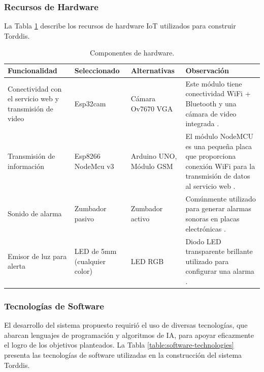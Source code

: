 \documentclass[a4paper,fleqn]{cas-sc}
\begin{document}
				\subsubsection*{Recursos de Hardware}
					La Tabla \ref{table:hardware-components} describe los recursos de hardware IoT utilizados para construir Torddis. 
					
					\begin{table}[htb]
						\caption{Componentes de hardware.}
						\label{table:hardware-components}
						\centering
						\begin{tabular}{p{}p{0.15\textwidth}p{}p{}}
							\hline
							\multicolumn{1}{l}{\textbf{Funcionalidad}} & \multicolumn{1}{l}{\textbf{Seleccionado}} & \multicolumn{1}{l}{\textbf{Alternativas}} & \multicolumn{1}{l}{\textbf{Observación}} \\ \hline
							Conectividad con el servicio web y transmisión de video & Esp32cam & Cámara Ov7670 VGA & Este módulo tiene conectividad WiFi + Bluetooth y una cámara de video integrada \citep{CasasSanchez2022}. \\
							Transmisión de información & Esp8266 NodeMcu v3 & Arduino UNO, Módulo GSM & El módulo NodeMCU es una pequeña placa que proporciona conexión WiFi para la transmisión de datos al servicio web \citep{Barai2019}. \\
							Sonido de alarma & Zumbador pasivo & Zumbador activo & Comúnmente utilizado para generar alarmas sonoras en placas electrónicas \citep{Adebisi2023development}. \\
							Emisor de luz para alerta & LED de 5mm (cualquier color) & LED RGB & Diodo LED transparente brillante utilizado para configurar una alarma \citep{Upender2020}.  \\ \hline
						\end{tabular}
					\end{table}
				
				\subsubsection*{Tecnologías de Software}
					El desarrollo del sistema propuesto requirió el uso de diversas tecnologías, que abarcan lenguajes de programación y algoritmos de IA, para apoyar eficazmente el logro de los objetivos planteados. La Tabla \ref{table:software-technologies} presenta las tecnologías de software utilizadas en la construcción del sistema Torddis.
				
\end{document}
